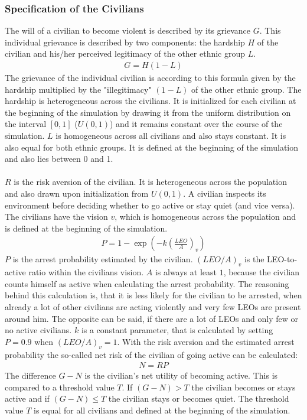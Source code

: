 \documentclass[11pt]{article}
\begin{document}
\subsubsection{Specification of the Civilians}
The will of a civilian to become violent is described by its grievance $G$. This individual grievance is described by two components: the hardship $H$ of the civilian and his/her perceived legitimacy of the other ethnic group $L$.
\begin{align}
G = H (1 - L)
\end{align}
The grievance of the individual civilian is according to this formula given by the hardship multiplied by the "illegitimacy" $(1 - L)$ of the other ethnic group. The hardship is heterogeneous across the civilians. It is initialized for each civilian at the beginning of the simulation by drawing it from the uniform distribution on the interval $[0,1]$ ($U(0,1)$) and it remains constant over the course of the simulation. $L$ is homogeneous across all civilians and also stays constant. It is also equal for both ethnic groups. It is defined at the beginning of the simulation and also lies between 0 and 1.\\
\\
$R$ is the risk aversion of the civilian. It is heterogeneous across the population and also drawn upon initialization from $U(0,1)$. A civilian inspects its environment before deciding whether to go active or stay quiet (and vice versa). The civilians have the vision $v$, which is homogeneous across the population and is defined at the beginning of the simulation.
\begin{align}
P = 1 - \exp \left( - k \left( \frac{LEO}{A} \right)_v \right)
\end{align}
$P$ is the arrest probability estimated by the civilian. $\left(LEO/A\right)_v$ is the LEO-to-active ratio within the civilians vision. $A$ is always at least $1$, because the civilian counts himself as active when calculating the arrest probability. The reasoning behind this calculation is, that it is less likely for the civilian to be arrested, when already a lot of other civilians are acting violently and very few LEOs are present around him. The opposite can be said, if there are a lot of LEOs and only few or no active civilians. $k$ is a constant parameter, that is calculated by setting $P = 0.9$ when $\left(LEO/A\right)_v = 1$. With the risk aversion and the estimated arrest probability the so-called net risk of the civilian of going active can be calculated:
\begin{align}
N = RP
\end{align}
The difference $G - N$ is the civilian's net utility of becoming active. This is compared to a threshold value $T$. If $(G - N) > T$ the civilian becomes or stays active and if $(G - N) \leq T$ the civilian stays or becomes quiet. The threshold value $T$ is equal for all civilians and defined at the beginning of the simulation.
\end{document}
